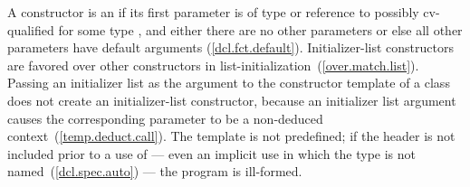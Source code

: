 \pnum
A constructor is an  if its first parameter is
of type  or reference to possibly cv-qualified
 for some type , and either there are no other
parameters or else all other parameters have default arguments (\ref{dcl.fct.default}).
\enternote Initializer-list constructors are favored over other constructors in
list-initialization~(\ref{over.match.list}). Passing an initializer list as the argument
to the constructor template  of a class  does not
create an initializer-list constructor, because an initializer list argument causes the 
corresponding parameter to be a non-deduced context~(\ref{temp.deduct.call}). \exitnote
The template
 is not predefined; if the header
 is not included prior to a use of
 --- even an implicit use in which the type is not
named~(\ref{dcl.spec.auto}) --- the program is ill-formed.

